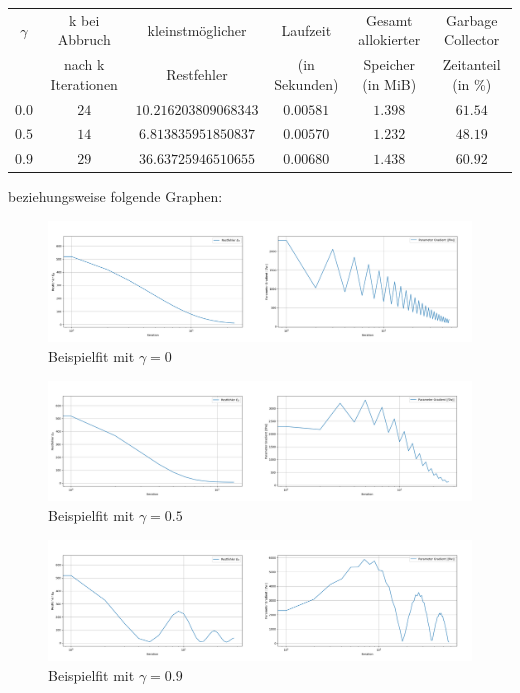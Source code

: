 \documentclass{article}
\theoremstyle{plain} %
\theoremstyle{definition} %
\begin{document}
\begin{center}
  \begin{tabular}{cccccc}
    \toprule
    $\gamma$ & k bei Abbruch& kleinstmöglicher & Laufzeit & Gesamt allokierter & Garbage Collector\\
    &  nach k Iterationen & Restfehler  & (in Sekunden) & Speicher (in MiB) & Zeitanteil (in \%) \\
    \midrule
        $0.0$ & $24$ & $10.216203809068343$ & $0.00581$ & $1.398$ & \sout{$61.54$} \\
        $0.5$ & $14$ & $6.813835951850837$  & $0.00570$ & $1.232$ & \sout{$48.19$} \\
        $0.9$ & $29$ & $36.63725946510655$  & $0.00680$ & $1.438$ & \sout{$60.92$} \\
  \end{tabular}
\end{center}

beziehungsweise folgende Graphen:

\begin{figure}[H]
  \centering
  \includegraphics[width=\textwidth]{Momentum_0_0_Error_10e-3}
  \caption{Beispielfit mit $\gamma=0$}
\end{figure}
\begin{figure}[H]
  \centering
  \includegraphics[width=\textwidth]{Momentum_0_5_Error_10e-3}
  \caption{Beispielfit mit $\gamma=0.5$}
\end{figure}
\begin{figure}[H]
  \centering
  \includegraphics[width=\textwidth]{Momentum_0_9_Error_10e-3}
  \caption{Beispielfit mit $\gamma=0.9$}
\end{figure}
\end{document}
